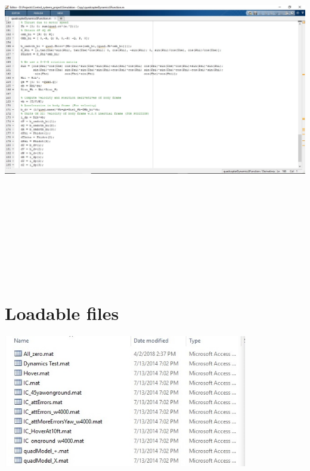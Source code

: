 \documentclass[9pt]{article}
\begin{document}
\begin{flushleft}
\newpage
\includegraphics[width=175mm,height=165mm]{22.jpg}

\end{flushleft}

\section{Loadable files}

\begin{center}
\includegraphics[width=0.8\textwidth]{13.jpg}
\end{center}
\end{document}
